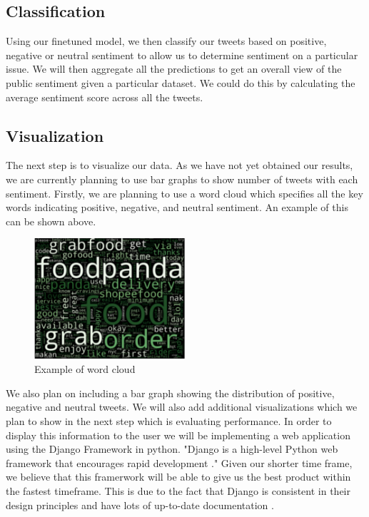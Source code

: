 \documentclass[conference]{IEEEtran}
\begin{document}
\subsection{Classification}
Using our finetuned model, we then classify our tweets based on positive, negative or neutral sentiment to allow us to determine sentiment on a particular issue.  
We will then aggregate all the predictions to get an overall view of the public sentiment given a particular dataset. 
We could do this by calculating the average sentiment score across all the tweets. 

\subsection{Visualization}
The next step is to visualize our data. 
As we have not yet obtained our results, we are currently planning to use bar graphs to show number of tweets with each sentiment. 
Firstly, we are planning to use a word cloud which specifies all the key words indicating positive, negative, and neutral sentiment. 
An example of this can be shown above.

\begin{figure}[t]
    \includegraphics[width=0.5\textwidth]{wordcloud.png}
    \caption{Example of word cloud\cite{b2}}
\end{figure}

 We also plan on including a bar graph showing the distribution of positive, negative and neutral tweets. 
 We will also add additional visualizations which we plan to show in the next step which is evaluating performance.
 In order to display this information to the user we will be implementing a web application using the Django Framework in python. 
 "Django is a high-level Python web framework that encourages rapid development \cite{b14}."
 Given our shorter time frame, we believe that this framerwork will be able to give us the best product within the fastest timeframe.
 This is due to the fact that Django is consistent in their design principles and have lots of up-to-date documentation \cite{b15}. 
\end{document}

